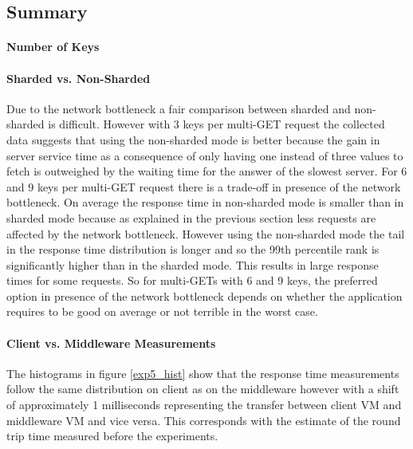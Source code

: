 \documentclass[report.tex]{subfiles}
\begin{document}
\subsection{Summary}




\paragraph{Number of Keys}

\paragraph{Sharded vs. Non-Sharded}
Due to the network bottleneck a fair comparison between sharded and non-sharded is difficult. 
However with 3 keys per multi-GET request the collected data suggests that using the non-sharded mode is better because the gain in server service time as a consequence of only having one instead of three values to fetch is outweighed by the waiting time for the answer of the slowest server. For 6 and 9 keys per multi-GET request there is a trade-off in presence of the network bottleneck. On average the response time in non-sharded mode is smaller than in sharded mode because as explained in the previous section less requests are affected by the network bottleneck. However using the non-sharded mode the tail in the response time distribution is longer and so the 99th percentile rank is significantly higher than in the sharded mode. This results in large response times for some requests.
So for multi-GETs with 6 and 9 keys, the preferred option in presence of the network bottleneck depends on whether the application requires to be good on average or not terrible in the worst case. 

\paragraph{Client vs. Middleware Measurements}
The histograms in figure \ref{exp5_hist} show that the response time measurements follow the same distribution on client as on the middleware however with a shift of approximately 1 milliseconds representing the transfer between client VM and middleware VM and vice versa. This corresponds with the estimate of the round trip time measured before the experiments. 
\end{document}
